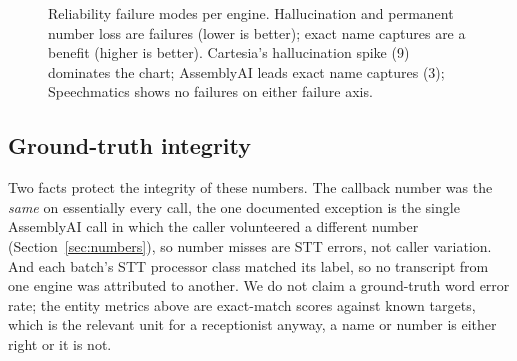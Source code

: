 \documentclass[11pt]{article}
\begin{document}
\begin{figure}[ht]
\centering
{}
\caption{Reliability failure modes per engine. Hallucination and permanent
number loss are failures (lower is better); exact name captures are a benefit
(higher is better). Cartesia's hallucination spike (9) dominates the chart;
AssemblyAI leads exact name captures (3); Speechmatics shows no failures on
either failure axis.}
\label{fig:reliability}
\end{figure}

\subsection{Ground-truth integrity}
\label{sec:gt}

Two facts protect the integrity of these numbers. The callback number was the
\emph{same} on essentially every call, the one documented exception is the
single AssemblyAI call in which the caller volunteered a different number
(Section~\ref{sec:numbers}), so number misses are STT errors, not caller
variation. And each batch's STT processor class matched its label, so no
transcript from one engine was attributed to another. We do not claim a
ground-truth word error rate; the entity metrics above are exact-match scores
against known targets, which is the relevant unit for a receptionist anyway, a
name or number is either right or it is not.
\end{document}
